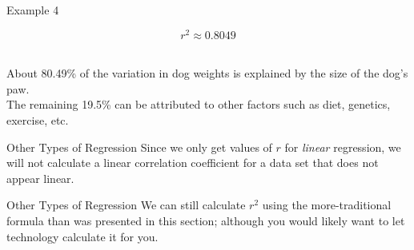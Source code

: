 \documentclass[t]{beamer}
\begin{document}
\begin{frame}{Example 4}
\begin{minipage}{0.3\textwidth}
\end{minipage}
\begin{minipage}{0.6\textwidth}
\[r^2 \approx 0.8049\]
\newline\\ \pause
\parbox{6cm}{
About 80.49\% of the variation in dog weights is explained by the size of the dog's paw.	\newline\\	\pause
The remaining 19.5\% can be attributed to other factors such as diet, genetics, exercise, etc.}
\end{minipage}
\end{frame}

\begin{frame}{Other Types of Regression}
Since we only get values of $r$ for \emph{linear} regression, we will not calculate a linear correlation coefficient for a data set that does not appear linear. \newline\\		\pause

\begin{center}
\end{center}
\end{frame}

\begin{frame}{Other Types of Regression}
We can still calculate $r^2$ using the more-traditional formula than was presented in this section; although you would likely want to let technology calculate it for you.
\end{frame}
\end{document}
